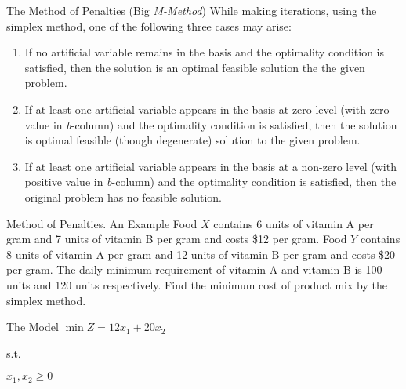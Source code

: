 \begin{frame}{The Method of Penalties (Big \emph{M-Method})}
  While making iterations, using the simplex method, one of the following three cases may arise:
  \begin{enumerate} \justifying \parskip5mm
  \item If \alert{no artificial variable remains in the basis} and the optimality condition is satisfied, then \alert{the solution is an optimal feasible solution the the given problem}.
  \item If at least one \alert{artificial variable appears in the basis at zero} level (with zero value in \emph{b}-column) and the optimality condition is satisfied, then \alert{the solution is optimal feasible (though degenerate)} solution to the given problem.
  \item If at least \alert{one artificial variable appears in the basis at a non-zero level} (with positive value in \emph{b}-column) and the optimality condition is satisfied, then \alert{the original problem has no feasible solution}.
  \end{enumerate}
\end{frame}

\begin{frame}{Method of Penalties. An Example}{}
      Food $X$ contains 6 units of vitamin A per gram and 7 units of vitamin B per gram and costs \$12  per gram. Food $Y$ contains 8 units of vitamin A per gram and 12 units of vitamin B per gram and costs \$20  per gram. The daily minimum requirement of vitamin A and vitamin B is 100 units and 120 units respectively. Find the minimum cost of product mix by the simplex method.


      \begin{block}{The Model} \justifying
          $\min Z = 12x_1 + 20x_2$

s.t.

$    x_1, x_2  \geq 0$
      \end{block}
\end{frame}

